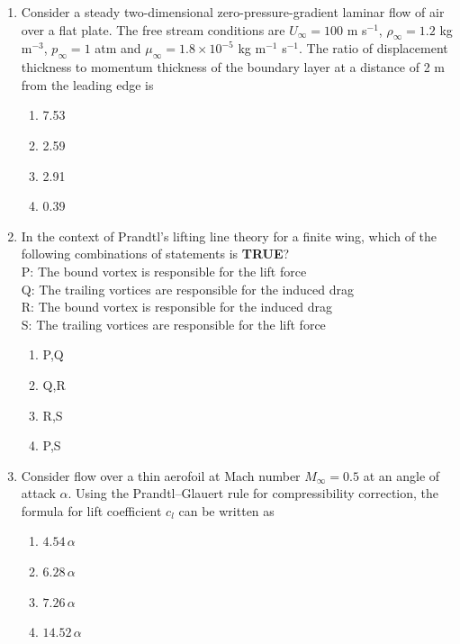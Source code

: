 \documentclass{article}
\begin{document}
\begin{enumerate}
\item Consider a steady two-dimensional zero-pressure-gradient laminar flow of air over a flat plate. The free stream conditions are $U_\infty=100$ m s$^{-1}$, $\rho_\infty=1.2$ kg m$^{-3}$, $p_\infty=1$ atm and $\mu_\infty=1.8\times 10^{-5}$ kg m$^{-1}$ s$^{-1}$. The ratio of displacement thickness to momentum thickness of the boundary layer at a distance of 2 m from the leading edge is
\begin{figure}[H]
    \centering
    
    \caption{}
    \label{fig:q45}
\end{figure}
\begin{multicols}{4}
\begin{enumerate}
\item 7.53
\item 2.59
\item 2.91
\item 0.39
\end{enumerate}
\end{multicols}

\item In the context of Prandtl’s lifting line theory for a finite wing, which of the following combinations of statements is \textbf{TRUE}?\\P: The bound vortex is responsible for the lift force\\Q: The trailing vortices are responsible for the induced drag\\R: The bound vortex is responsible for the induced drag\\S: The trailing vortices are responsible for the lift force
\begin{multicols}{4}
\begin{enumerate}
\item P,Q
\item Q,R
\item R,S
\item P,S
\end{enumerate}
\end{multicols}

\item Consider flow over a thin aerofoil at Mach number $M_\infty=0.5$ at an angle of attack $\alpha$. Using the Prandtl–Glauert rule for compressibility correction, the formula for lift coefficient $c_l$ can be written as
\begin{multicols}{4}
\begin{enumerate}
\item $4.54\,\alpha$
\item $6.28\,\alpha$
\item $7.26\,\alpha$
\item $14.52\,\alpha$
\end{enumerate}
\end{multicols}


\end{enumerate}
\end{document}
